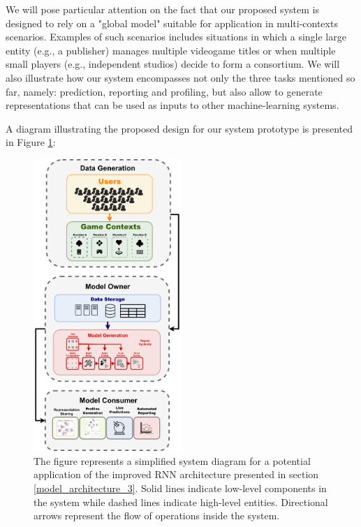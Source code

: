 We will pose particular attention on the fact that our proposed system is designed to rely on a "global model" \cite{wang2019deep} suitable for application in multi-contexts scenarios. Examples of such scenarios includes situations in which a single large entity (e.g., a publisher) manages multiple videogame titles or when multiple small players (e.g., independent studios) decide to form a consortium. We will also illustrate how our system encompasses not only the three tasks mentioned so far, namely: prediction, reporting and profiling, but also allow to generate representations that can be used as inputs to other machine-learning systems. 

A diagram illustrating the proposed design for our system prototype is presented in Figure \ref{pipeline}:

\begin{figure}[ht]
\centering
\includegraphics[width=0.5\textwidth]{images/chapter_5/pipeline_diagram.png}
\caption[\textbf{Engagement Prediction and Quantification - System prototype Design Diagram}]{The figure represents a simplified system diagram for a potential application of the improved RNN architecture presented in section \ref{model_architecture_3}. Solid lines indicate low-level components in the system while dashed lines indicate high-level entities. Directional arrows represent the flow of operations inside the system.}
\label{pipeline}
\end{figure}

